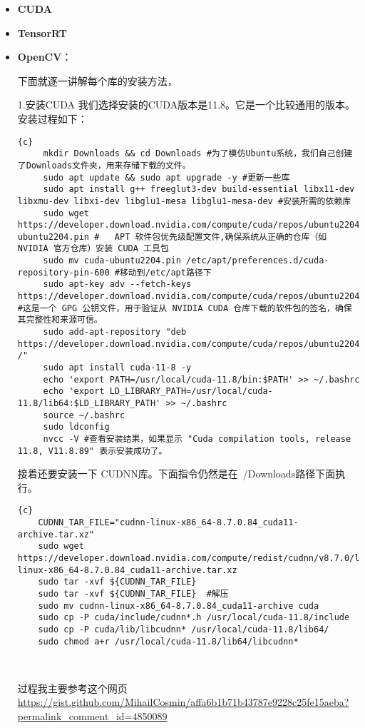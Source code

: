 \begin{itemize}
\item \textbf{CUDA}
\item \textbf{TensorRT}
\item \textbf{OpenCV}：

下面就逐一讲解每个库的安装方法，

1.安装CUDA
我们选择安装的CUDA版本是11.8。它是一个比较通用的版本。
安装过程如下：
\begin{lstlisting}{c}
     mkdir Downloads && cd Downloads #为了模仿Ubuntu系统，我们自己创建了Downloads文件夹，用来存储下载的文件。
     sudo apt update && sudo apt upgrade -y #更新一些库
     sudo apt install g++ freeglut3-dev build-essential libx11-dev libxmu-dev libxi-dev libglu1-mesa libglu1-mesa-dev #安装所需的依赖库
     sudo wget https://developer.download.nvidia.com/compute/cuda/repos/ubuntu2204/x86_64/cuda-ubuntu2204.pin #   APT 软件包优先级配置文件,确保系统从正确的仓库（如 NVIDIA 官方仓库）安装 CUDA 工具包
     sudo mv cuda-ubuntu2204.pin /etc/apt/preferences.d/cuda-repository-pin-600 #移动到/etc/apt路径下 
     sudo apt-key adv --fetch-keys https://developer.download.nvidia.com/compute/cuda/repos/ubuntu2204/x86_64/3bf863cc.pub #这是一个 GPG 公钥文件，用于验证从 NVIDIA CUDA 仓库下载的软件包的签名，确保其完整性和来源可信。 
     sudo add-apt-repository "deb https://developer.download.nvidia.com/compute/cuda/repos/ubuntu2204/x86_64/ /" 
     sudo apt install cuda-11-8 -y   
     echo 'export PATH=/usr/local/cuda-11.8/bin:$PATH' >> ~/.bashrc  
     echo 'export LD_LIBRARY_PATH=/usr/local/cuda-11.8/lib64:$LD_LIBRARY_PATH' >> ~/.bashrc 
     source ~/.bashrc 
     sudo ldconfig
     nvcc -V #查看安装结果，如果显示 "Cuda compilation tools, release 11.8, V11.8.89" 表示安装成功了。
\end{lstlisting}
接着还要安装一下 CUDNN库。下面指令仍然是在~/Downloads路径下面执行。
\begin{lstlisting}{c}
    CUDNN_TAR_FILE="cudnn-linux-x86_64-8.7.0.84_cuda11-archive.tar.xz" 
    sudo wget https://developer.download.nvidia.com/compute/redist/cudnn/v8.7.0/local_installers/11.8/cudnn-linux-x86_64-8.7.0.84_cuda11-archive.tar.xz  
    sudo tar -xvf ${CUDNN_TAR_FILE} 
    sudo tar -xvf ${CUDNN_TAR_FILE}  #解压
    sudo mv cudnn-linux-x86_64-8.7.0.84_cuda11-archive cuda
    sudo cp -P cuda/include/cudnn*.h /usr/local/cuda-11.8/include   
    sudo cp -P cuda/lib/libcudnn* /usr/local/cuda-11.8/lib64/                                                                 
    sudo chmod a+r /usr/local/cuda-11.8/lib64/libcudnn*



\end{lstlisting}

过程我主要参考这个网页\url{https://gist.github.com/MihailCosmin/affa6b1b71b43787e9228c25fe15aeba?permalink_comment_id=4850089}


\end{itemize}
